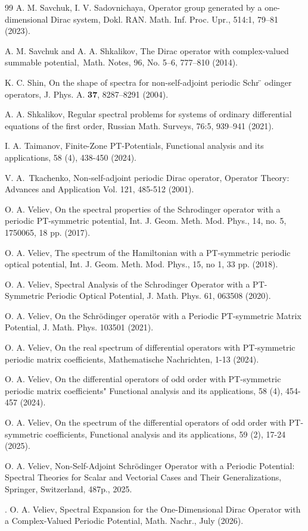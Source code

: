 \documentclass{article}%
\providecommand{\U}[1]{\protect\rule{.1in}{.1in}}
\providecommand{\U}[1]{\protect\rule{.1in}{.1in}}
\providecommand{\U}[1]{\protect\rule{.1in}{.1in}}
\providecommand{\U}[1]{\protect\rule{.1in}{.1in}}
\providecommand{\U}[1]{\protect\rule{.1in}{.1in}}
\providecommand{\U}[1]{\protect\rule{.1in}{.1in}}
\providecommand{\U}[1]{\protect\rule{.1in}{.1in}}
\providecommand{\U}[1]{\protect\rule{.1in}{.1in}}
\providecommand{\U}[1]{\protect\rule{.1in}{.1in}}
\providecommand{\U}[1]{\protect\rule{.1in}{.1in}}
\providecommand{\U}[1]{\protect\rule{.1in}{.1in}}
\providecommand{\U}[1]{\protect\rule{.1in}{.1in}}
\providecommand{\U}[1]{\protect\rule{.1in}{.1in}}
\providecommand{\U}[1]{\protect\rule{.1in}{.1in}}
\providecommand{\U}[1]{\protect\rule{.1in}{.1in}}
\providecommand{\U}[1]{\protect\rule{.1in}{.1in}}
\providecommand{\U}[1]{\protect\rule{.1in}{.1in}}
\providecommand{\U}[1]{\protect\rule{.1in}{.1in}}
\providecommand{\U}[1]{\protect\rule{.1in}{.1in}}
\providecommand{\U}[1]{\protect\rule{.1in}{.1in}}
\providecommand{\U}[1]{\protect\rule{.1in}{.1in}}
\providecommand{\U}[1]{\protect\rule{.1in}{.1in}}
\providecommand{\U}[1]{\protect\rule{.1in}{.1in}}
\providecommand{\U}[1]{\protect\rule{.1in}{.1in}}
\providecommand{\U}[1]{\protect\rule{.1in}{.1in}}
\providecommand{\U}[1]{\protect\rule{.1in}{.1in}}
\providecommand{\U}[1]{\protect\rule{.1in}{.1in}}
\providecommand{\U}[1]{\protect\rule{.1in}{.1in}}
\providecommand{\U}[1]{\protect\rule{.1in}{.1in}}
\begin{document}
\begin{thebibliography}{99}
\bibitem {}A. M. Savchuk, I. V. Sadovnichaya, Operator group generated by a
one-dimensional Dirac system, Dokl. RAN. Math. Inf. Proc. Upr., 514:1, 79--81 (2023).

\bibitem {}A. M. Savchuk and A. A. Shkalikov, The Dirac operator with
complex-valued summable potential,\ Math. Notes, 96, No. 5--6, 777--810 (2014).

\bibitem {}K. C. Shin, On the shape of spectra for non-self-adjoint periodic
Schr%
\"{}%
odinger operators, J. Phys. A. \textbf{37}, 8287--8291 (2004).

\bibitem {}A. A. Shkalikov, Regular spectral problems for systems of ordinary
differential equations of the first order, Russian Math. Surveys, 76:5,
939--941 (2021).

\bibitem {}I. A. Taimanov, Finite-Zone PT-Potentials, Functional analysis and
its applications, 58 (4), 438-450 (2024).

\bibitem {}V. A.\ Tkachenko, Non-self-adjoint periodic Dirac operator,
Operator Theory: Advances and Application Vol. 121, 485-512 (2001).

\bibitem {}O. A. Veliev, On the spectral properties of the Schrodinger
operator with a periodic PT-symmetric potential, Int. J. Geom. Meth. Mod.
Phys., 14, no. 5, 1750065, 18 pp. (2017).

\bibitem {}O. A. Veliev, The spectrum of the Hamiltonian with a PT-symmetric
periodic optical potential, Int. J. Geom. Meth. Mod. Phys., 15, no 1, 33 pp. (2018).

\bibitem {}O. A. Veliev, Spectral Analysis of the Schrodinger Operator with a
PT-Symmetric Periodic Optical Potential, J. Math. Phys. 61, 063508 (2020).

\bibitem {}O. A. Veliev, On the Schr\"{o}dinger operat\"{o}r with a Periodic
PT-symmetric Matrix Potential, J. Math. Phys. 103501 (2021).

\bibitem {}O. A. Veliev, On the real spectrum of differential operators with
PT-symmetric periodic matrix coefficients, Mathematische Nachrichten, 1-13 (2024).

\bibitem {}O. A. Veliev, On the differential operators of odd order with
PT-symmetric periodic matrix coefficients" Functional analysis and its
applications, 58 (4), 454-457 (2024).

\bibitem {}O. A. Veliev, On the spectrum of the differential operators of odd
order with PT-symmetric coefficients, Functional analysis and its
applications, 59 (2), 17-24 (2025).

\bibitem {}O. A. Veliev, Non-Self-Adjoint Schr\"{o}dinger Operator with a
Periodic Potential: Spectral Theories for Scalar and Vectorial Cases and Their
Generalizations, Springer, Switzerland, 487p., 2025.

\bibitem {}. O. A. Veliev, Spectral Expansion for the One-Dimensional Dirac
Operator with a Complex-Valued Periodic Potential, Math. Nachr., July (2026).
\end{thebibliography}
\end{document}
